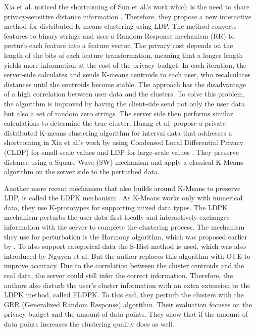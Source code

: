 Xia et al. noticed the shortcoming of Sun et al.'s work which is the need to share privacy-sensitive distance information \citep{xia_distributed_2020-1}.
Therefore, they propose a new interactive method for distributed K-means clustering using LDP.
The method converts features to binary strings and uses a Random Response mechanism (RR) to perturb each feature into a feature vector.
The privacy cost depends on the length of the bits of each feature transformation, meaning that a longer length yields more information at the cost of the privacy budget.
In each iteration, the server-side calculates and sends K-means centroids to each user, who recalculates distances until the centroids become stable.
The approach has the disadvantage of a high correlation between user data and the clusters.
To solve this problem, the algorithm is improved by having the client-side send not only the user data but also a set of random zero strings.
The server side then performs similar calculations to determine the true cluster.
Huang et al. propose a private distributed K-means clustering algorithm for interval data that addresses a shortcoming in Xia et al.'s work by using Condensed Local Differential Privacy (CLDP) for small-scale values and LDP for large-scale values \citep{9679364}.
They preserve distance using a Square Wave (SW) mechanism and apply a classical K-Means algorithm on the server side to the perturbed data.

Another more recent mechanism that also builds around K-Means to preserve LDP, is called the LDPK mechanism \citep{yuan_privacypreserving_2021}.
As K-Means works only with numerical data, they use K-prototypes for supporting mixed data types.
The LDPK mechanism perturbs the user data first locally and interactively exchanges information with the server to complete the clustering process.
The mechanism they use for perturbation is the Harmony algorithm, which was proposed earlier by \citep{nguyen_collecting_2016}.
To also support categorical data the S-Hist method is used, which was also introduced by Nguyen et al.
But the author replaces this algorithm with OUE \cite{wang_locally_nodate} to improve accuracy.
Due to the correlation between the cluster centroids and the real data, the server could still infer the correct information.
Therefore, the authors also disturb the user’s cluster information with an extra extension to the LDPK method, called ELDPK.
To this end, they perturb the clusters with the GRR (Generalized Random Response) algorithm.
Their evaluation focuses on the privacy budget and the amount of data points.
They show that if the amount of data points increases the clustering quality does as well.


